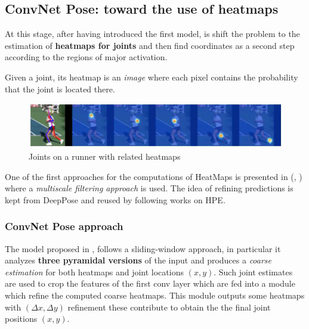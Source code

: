 \subsection{ConvNet Pose: toward the use of heatmaps}
At this stage, after having introduced the first model, is shift the problem to the estimation of \textbf{heatmaps for joints} and then find coordinates as a second step according to the regions of major activation.
\begin{definition}
    Given a joint, its heatmap is an \textit{image} where each pixel contains the probability that the joint is located there.
\end{definition}
\begin{figure}[h]
    \centering
    \includegraphics[scale=0.8]{img/HeatMap.png}
    \caption{Joints on a runner with related heatmaps}
\end{figure}

One of the first approaches for the computations of HeatMaps is presented in  (\citeauthor{ConvNetPose}, \cite{ConvNetPose}) where a \textit{multiscale filtering approach} is used. The idea of refining predictions is kept from DeepPose and reused by following works on HPE.\\
\subsubsection{ConvNet Pose approach}
The model proposed in \cite{ConvNetPose}, follows a sliding-window approach, in particular it analyzes \textbf{three pyramidal versions} of the input and produces a \textit{coarse estimation} for both heatmaps and joint locations $(x,y)$. Such joint estimates are used to crop the features of the first conv layer which are fed into a module which refine the computed coarse heatmaps. This module outputs some heatmaps with $(\Delta{x}, \Delta{y})$ refinement these contribute to obtain the the final joint positions $(x,y)$. 

